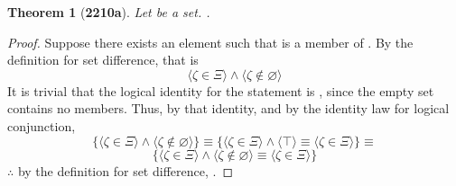 \documentclass[preview]{standalone}
\newtheorem*{theorem*}{Theorem}
\begin{document}
\begin{theorem*}[\textbf{2210a}] \color{black}
    Let \bm{$\Xi$} be a set. 
    \bm{$\Xi - \varnothing = \Xi$}.
\end{theorem*}
\begin{proof} \color{black}
    Suppose there exists an element \bm{$\zeta$} such that \bm{$\zeta$} is a member of 
    \bm{$\Xi - \varnothing$}.
    By the definition for set difference, that is
    \begin{equation*}
        \Big \langle \zeta \in \Xi \Big \rangle
            \land 
        \Big \langle \zeta \notin \varnothing \Big \rangle
    \end{equation*}
    It is trivial that the logical identity for the statement 
    \bm{$\zeta \notin \varnothing$} is \bm{$\top$},
    since the empty set contains no members. 
    Thus, by that identity, 
    and by the identity law for logical conjunction,
    \begin{equation*}
        \Bigg\{
            \Big \langle \zeta \in \Xi \Big \rangle
                \land 
            \Big \langle \zeta \notin \varnothing \Big \rangle
        \Bigg\}
            \equiv
        \Bigg\{
            \Big \langle \zeta \in \Xi \Big \rangle
                \land 
            \Big \langle \top \Big \rangle
                \equiv
            \Big \langle \zeta \in \Xi \Big \rangle
        \Bigg\}
            \equiv
    \end{equation*}
    \begin{equation*}
        \Bigg\{
            \Big \langle \zeta \in \Xi \Big \rangle
                \land 
            \Big \langle \zeta \notin \varnothing \Big \rangle
                \equiv
            \Big \langle \zeta \in \Xi \Big \rangle
        \Bigg\}
    \end{equation*}
    $\therefore$ by the definition for set difference,
    \bm{$\Xi - \varnothing = \Xi$}.
\color{lightgray} \end{proof}
\end{document}
